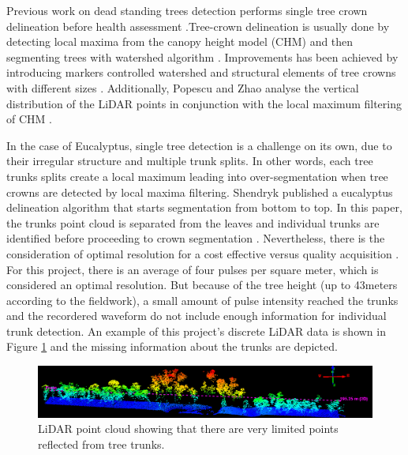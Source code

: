 \documentclass{subfiles}
\begin{document}
\par Previous work on dead standing trees detection performs single tree crown delineation before health assessment \cite{Yao2012} \cite{Shendryk2016_DeadTrees}.Tree-crown delineation is usually done by detecting local maxima from the canopy height model (CHM) and then segmenting trees with watershed algorithm \cite{Popescu2003}. Improvements has been achieved by introducing markers controlled watershed \cite{Jing2012} and structural elements of tree crowns with different sizes \cite{Hu2014}. Additionally, Popescu and Zhao analyse the vertical distribution of the LiDAR points in conjunction with the local maximum filtering of CHM \cite{Popescu2008}.


 \par  In the case of Eucalyptus, single tree detection is a challenge on its own, due to their irregular structure and multiple trunk splits. In other words, each tree trunks splits create a local maximum leading into over-segmentation when tree crowns are detected by local maxima filtering. Shendryk published a eucalyptus delineation algorithm that starts segmentation from bottom to top. In this paper, the trunks point cloud is separated from the leaves and individual trunks are identified before proceeding to crown segmentation \cite{Shendryk2016_treeDeliniation}. Nevertheless, there is the consideration of optimal resolution for a cost effective versus quality acquisition \cite{Lovell2005}. For this project, there is an average of four pulses per square meter, which is considered an optimal resolution. But because of the tree height (up to 43meters according to the fieldwork), a small amount of pulse intensity reached the trunks and the recordered waveform do not include enough information for individual trunk detection.  An example of this project's discrete LiDAR data is shown in Figure \ref{fig:NoTrunks} and the missing information about the trunks are depicted.
 
   	\begin{figure} [h!]
   		\centering
   		\includegraphics[trim={7cm 0 1.7cm 0},clip,width=\textwidth]{img/TreesNoTrunks}
   		\caption{LiDAR point cloud showing that there are very limited points reflected from tree trunks.}
   		\label{fig:NoTrunks}
   	\end{figure}
   	
\end{document}
